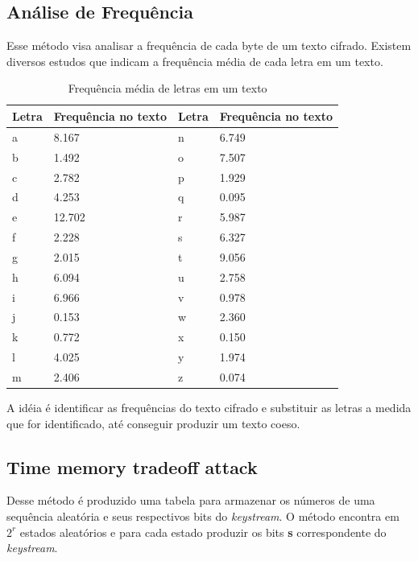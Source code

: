 \subsection{Análise de Frequência}
\label{frequency-analysis}

Esse método visa analisar a frequência de cada byte de um texto cifrado. Existem diversos estudos que indicam a frequência média de cada letra em um texto. 

\begin{table}[h]
\centering
\begin{tabular}{|l|l|l|l|}
	\hline
	Letra & Frequência no texto & Letra & Frequência no texto \\ \hline
	a & 8.167 & n & 6.749 \\ \hline
	b & 1.492 & o & 7.507 \\ \hline
	c & 2.782 & p & 1.929 \\ \hline
	d & 4.253 & q & 0.095 \\ \hline
	e & 12.702 & r & 5.987 \\ \hline
	f & 2.228 & s & 6.327 \\ \hline
	g & 2.015 & t & 9.056 \\ \hline
	h & 6.094 & u & 2.758 \\ \hline
	i & 6.966 & v & 0.978 \\ \hline
	j & 0.153 & w & 2.360 \\ \hline
	k & 0.772 & x & 0.150 \\ \hline
	l & 4.025 & y & 1.974 \\ \hline
	m & 2.406 & z & 0.074 \\ \hline
\end{tabular}
\caption{Frequência média de letras em um texto ~\cite{robert-lewand}} 
\end{table}

A idéia é identificar as frequências do texto cifrado e substituir as letras a medida que for identificado, até conseguir produzir um texto coeso.

\subsection{Time memory tradeoff attack}
\label{time-memory-tradeoff-attack}

Desse método é produzido uma tabela para armazenar os números de uma sequência aleatória e seus respectivos bits do \textit{keystream}. O método encontra em $2^r$ estados aleatórios e para cada estado produzir os bits \textbf{s} correspondente do \textit{keystream}. 

